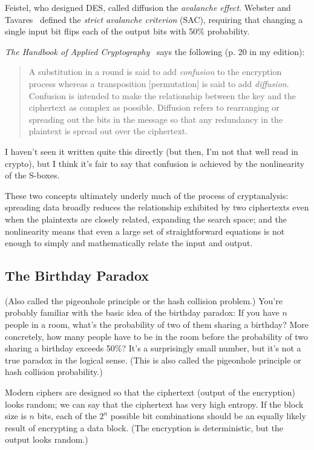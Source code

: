 Feistel, who designed DES, called diffusion the \emph{avalanche
  effect}.  Webster and Tavares~\cite{webster86:avalanche} defined the
\emph{strict avalanche criterion} (SAC), requiring that changing a
single input bit flips each of the output bits with 50\% probability.

\emph{The Handbook of Applied Cryptography}~\cite{menezes1996handbook}
says the following (p. 20 in my edition):

\begin{quote}
A substitution in a round is said to add \emph{confusion} to the
encryption process whereas a transposition [permutation] is said to
add \emph{diffusion}. Confusion is intended to make the relationship
between the key and the ciphertext as complex as possible.  Diffusion
refers to rearranging or spreading out the bits in the message so that
any redundancy in the plaintext is spread out over the ciphertext.
\end{quote}

\aono{}
I haven't seen it written quite this directly (but then, I'm not that
well read in crypto), but I think it's fair to say that confusion is
achieved by the nonlinearity of the S-boxes.

These two concepts ultimately underly much of the process of
cryptanalysis: spreading data broadly reduces the relationship
exhibited by two ciphertexts even when the plaintexts are closely
related, expanding the search space; and the nonlinearity means that
even a large set of straightforward equations is not enough to simply
and mathematically relate the input and output.

\subsection{The Birthday Paradox}
\label{sec: birthday}

(Also called the pigeonhole principle or the hash collision problem.)
You're probably familiar with the basic idea of the birthday paradox:
If you have $n$ people in a room, what's the probability of two of
them sharing a birthday?  More concretely, how many people have to be
in the room before the probability of two sharing a birthday exceeds
50\%?  It's a surprisingly small number, but it's not a true paradox in
the logical sense.  (This is also called the pigeonhole principle or
hash collision probability.)

Modern ciphers are designed so that the ciphertext (output of the
encryption) looks random; we can say that the ciphertext has very high
entropy.  If the block size is $n$ bits, each of the $2^n$ possible
bit combinations should be an equally likely result of encrypting a
data block.  (The encryption is deterministic, but the output looks
random.)


